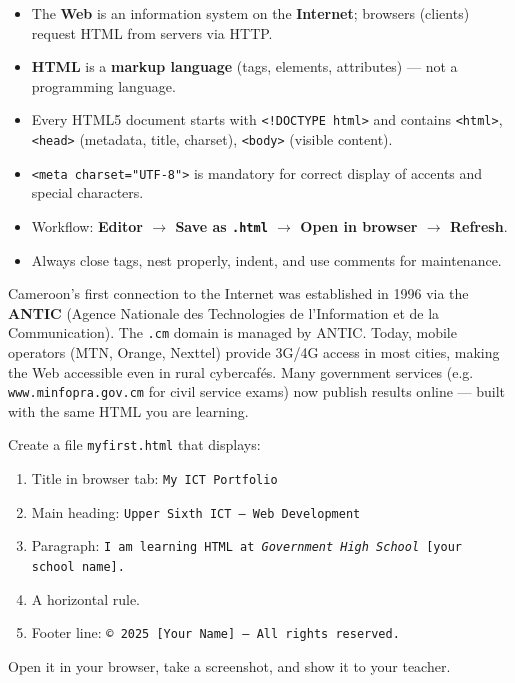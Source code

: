 \documentclass[11pt]{article}
\newcounter{popsec}
\newcounter{popsub}
\newcommand{\courssub}[1]{%
  \stepcounter{popsub}%
  \par\vspace{9pt}\noindent{\popxbold\fontsize{11.5}{13}\selectfont\color{popink}{\color{poporange}\thepopsec.\thepopsub}\hspace{6pt}#1}\par\nopagebreak\vspace{4pt}
}
\begin{document}
\courssub{Summary of key points}

\begin{aretenir}
\begin{itemize}
\item The \textbf{Web} is an information system on the \textbf{Internet}; browsers (clients) request HTML from servers via HTTP.
\item \textbf{HTML} is a \textbf{markup language} (tags, elements, attributes) --- not a programming language.
\item Every HTML5 document starts with \texttt{<!DOCTYPE html>} and contains \texttt{<html>}, \texttt{<head>} (metadata, title, charset), \texttt{<body>} (visible content).
\item \texttt{<meta charset="UTF-8">} is mandatory for correct display of accents and special characters.
\item Workflow: \textbf{Editor $\rightarrow$ Save as \texttt{.html} $\rightarrow$ Open in browser $\rightarrow$ Refresh}.
\item Always close tags, nest properly, indent, and use comments for maintenance.
\end{itemize}
\end{aretenir}

\begin{savaistu}
Cameroon's first connection to the Internet was established in 1996 via the \textbf{ANTIC} (Agence Nationale des Technologies de l'Information et de la Communication). The \texttt{.cm} domain is managed by ANTIC. Today, mobile operators (MTN, Orange, Nexttel) provide 3G/4G access in most cities, making the Web accessible even in rural cybercafés. Many government services (e.g. \texttt{www.minfopra.gov.cm} for civil service exams) now publish results online --- built with the same HTML you are learning.
\end{savaistu}

\begin{exercice}
Create a file \texttt{myfirst.html} that displays:
\begin{enumerate}
\item Title in browser tab: \texttt{My ICT Portfolio}
\item Main heading: \texttt{Upper Sixth ICT --- Web Development}
\item Paragraph: \texttt{I am learning HTML at \emph{Government High School} [your school name].}
\item A horizontal rule.
\item Footer line: \texttt{© 2025 [Your Name] --- All rights reserved.}
\end{enumerate}
Open it in your browser, take a screenshot, and show it to your teacher.
\end{exercice}
\end{document}
